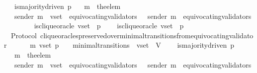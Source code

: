 \begin{isabellebody}
\ \ {\isasymlongrightarrow}\ is{\isacharunderscore}majority{\isacharunderscore}driven\ p\isanewline
\ \ {\isasymlongrightarrow}\ m{\isacharprime}\ {\isacharequal}\ the{\isacharunderscore}elem\ {\isacharparenleft}{\isasymsigma}{\isacharprime}\ {\isacharminus}\ {\isasymsigma}{\isacharparenright}\isanewline
\ \ {\isasymlongrightarrow}\ sender\ m{\isacharprime}\ {\isasymin}\ v{\isacharunderscore}set\ {\isacharminus}\ equivocating{\isacharunderscore}validators\ {\isasymsigma}\ {\isasymand}\ sender\ m{\isacharprime}\ {\isasymnotin}\ equivocating{\isacharunderscore}validators\ {\isasymsigma}{\isacharprime}\isanewline
\ \ \ \ \ \ {\isasymand}\ is{\isacharunderscore}clique{\isacharunderscore}oracle\ {\isacharparenleft}v{\isacharunderscore}set{\isacharcomma}\ {\isasymsigma}{\isacharcomma}\ p{\isacharparenright}\ \isanewline
\ \ {\isasymlongrightarrow}\ is{\isacharunderscore}clique{\isacharunderscore}oracle\ {\isacharparenleft}v{\isacharunderscore}set{\isacharcomma}\ {\isasymsigma}{\isacharprime}{\isacharcomma}\ p{\isacharparenright}{\isachardoublequoteclose}\isanewline
%
\isadelimproof
\ \ %
\endisadelimproof
%
\isatagproof
{}\isamarkupfalse%
%
\endisatagproof
{\isafoldproof}%
%
\isadelimproof
\isanewline
%
\endisadelimproof
\isanewline
\isanewline
{}\isamarkupfalse%
\ {\isacharparenleft}\ Protocol{\isacharparenright}\ clique{\isacharunderscore}oracles{\isacharunderscore}preserved{\isacharunderscore}over{\isacharunderscore}minimal{\isacharunderscore}transitions{\isacharunderscore}from{\isacharunderscore}equivocating{\isacharunderscore}validator\ {\isacharcolon}\isanewline
\ \ {\isachardoublequoteopen}{\isasymforall}\ {\isasymsigma}\ {\isasymsigma}{\isacharprime}\ m{\isacharprime}\ v{\isacharunderscore}set\ p{\isachardot}\ {\isacharparenleft}{\isasymsigma}{\isacharcomma}\ {\isasymsigma}{\isacharprime}{\isacharparenright}\ {\isasymin}\ minimal{\isacharunderscore}transitions\ {\isasymand}\ v{\isacharunderscore}set\ {\isasymsubseteq}\ V\ \isanewline
\ \ {\isasymlongrightarrow}\ is{\isacharunderscore}majority{\isacharunderscore}driven\ p\isanewline
\ \ {\isasymlongrightarrow}\ m{\isacharprime}\ {\isacharequal}\ the{\isacharunderscore}elem\ {\isacharparenleft}{\isasymsigma}{\isacharprime}\ {\isacharminus}\ {\isasymsigma}{\isacharparenright}\isanewline
\ \ {\isasymlongrightarrow}\ sender\ m{\isacharprime}\ {\isasymin}\ v{\isacharunderscore}set\ {\isacharminus}\ equivocating{\isacharunderscore}validators\ {\isasymsigma}\ {\isasymand}\ sender\ m{\isacharprime}\ {\isasymin}\ equivocating{\isacharunderscore}validators\ {\isasymsigma}{\isacharprime}\isanewline

\end{isabellebody}
